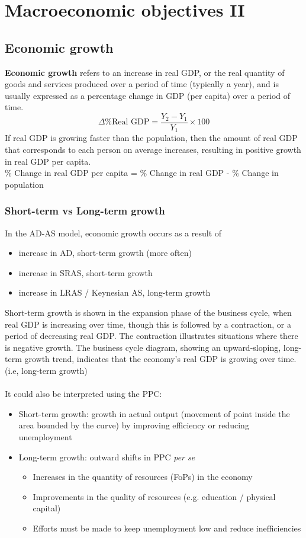 \documentclass[a4paper,12pt]{article}
\newcommand{\needbold}[1]{\textcolor{red!70!black}{\textbf{#1}}}
\begin{document}
\section{Macroeconomic objectives II}
\subsection{Economic growth}
\needbold{Economic growth} refers to an increase in real GDP, or the real quantity of goods and services produced over a period of time (typically a year), and is usually expressed as a percentage change in GDP (per capita) over a period of time.
\[\Delta \%\text{Real GDP}=\dfrac{Y_2-Y_1}{Y_1}\times 100\]
If real GDP is growing faster than the population, then the amount of real GDP that corresponds to each person on average increases, resulting in positive growth in real GDP per capita.\\
\% Change in real GDP per capita = \% Change in real GDP - \% Change in population
\subsubsection*{Short-term vs Long-term growth}
In the AD-AS model, economic growth occurs as a result of
\begin{itemize}
  \item increase in AD, short-term growth (more often)
  \item increase in SRAS, short-term growth
  \item increase in LRAS / Keynesian AS, long-term growth
\end{itemize}
Short-term growth is shown in the expansion phase of the business cycle, when real GDP is increasing over time, though this is followed by a contraction, or a period of decreasing real GDP. The contraction illustrates situations where there is negative growth. 
The business cycle diagram, showing an upward-sloping, long-term growth trend, indicates that the economy's real GDP is growing over time. (i.e, long-term growth)\\\\
It could also be interpreted using the PPC: 
\begin{itemize}
  \item Short-term growth: growth in actual output (movement of point inside the area bounded by the curve) by improving efficiency or reducing unemployment
  \item Long-term growth: outward shifts in PPC \emph{per se}
  \begin{itemize}
    \item Increases in the quantity of resources (FoPs) in the economy
    \item Improvements in the quality of resources (e.g. education / physical capital)
    \item Efforts must be made to keep unemployment low and reduce inefficiencies
  \end{itemize} 
\end{itemize}
\end{document}
